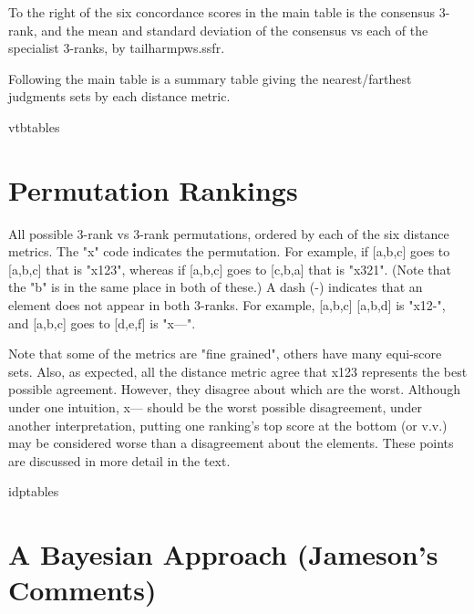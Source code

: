 \documentclass{article}
\begin{document}
To the right of the six concordance scores in the main table is the consensus 3-rank, and the mean and standard deviation of the consensus vs each of the specialist 3-ranks, by tailharmpws.ssfr.  

Following the main table is a summary table giving the nearest/farthest judgments sets by each distance metric. 

{vtbtables}

\newpage

\section{Permutation Rankings}

All possible 3-rank vs 3-rank permutations, ordered by each of the six distance metrics. The "x" code indicates the permutation. For example, if [a,b,c] goes to [a,b,c] that is "x123", whereas if  [a,b,c] goes to [c,b,a] that is "x321". (Note that the "b" is in the same place in both of these.) A dash (-) indicates that an element does not appear in both 3-ranks. For example, [a,b,c]  [a,b,d] is "x12-", and  [a,b,c] goes to [d,e,f] is "x---". 

Note that some of the metrics are "fine grained", others have many equi-score sets. Also, as expected, all the distance metric agree that x123 represents the best possible agreement. However, they disagree about which are the worst. Although under one intuition, x--- should be the worst possible disagreement, under another interpretation, putting one ranking's top score at the bottom (or v.v.) may be considered worse than a disagreement about the elements. These points are discussed in more detail in the text.

{idptables}

\newpage

\section{A Bayesian Approach (Jameson's Comments)}
\end{document}
